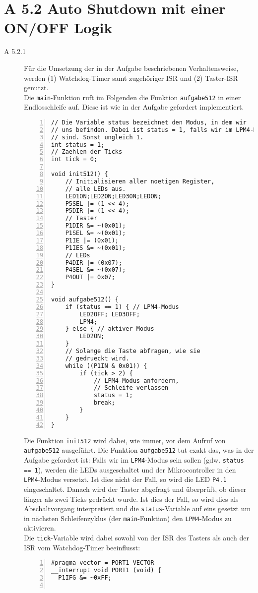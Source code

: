 \documentclass[11pt,a4paper,ngerman]{article}
\begin{document}
\section*{A 5.2 Auto Shutdown mit einer ON/OFF Logik}
\begin{description}
	\item[A 5.2.1] Für die Umsetzung der in der Aufgabe beschriebenen Verhaltensweise, werden (1) Watchdog-Timer samt zugehöriger ISR und (2) Taster-ISR genutzt. \\

	Die \texttt{main}-Funktion ruft im Folgenden die Funktion \texttt{aufgabe512} in einer Endlosschleife auf. Diese ist wie in der Aufgabe gefordert implementiert.
	
	\begin{lstlisting}[numbers=left]
// Die Variable status bezeichnet den Modus, in dem wir
// uns befinden. Dabei ist status = 1, falls wir im LPM4-Modus
// sind. Sonst ungleich 1.
int status = 1;
// Zaehlen der Ticks
int tick = 0;

void init512() {
	// Initialisieren aller noetigen Register,
	// alle LEDs aus.
	LED1ON;LED2ON;LED3ON;LEDON;
	P5SEL |= (1 << 4);
	P5DIR |= (1 << 4);
	// Taster
	P1DIR &= ~(0x01);
    P1SEL &= ~(0x01);
    P1IE |= (0x01);
    P1IES &= ~(0x01);
	// LEDs
    P4DIR |= (0x07);
    P4SEL &= ~(0x07);
    P4OUT |= 0x07;
}

void aufgabe512() {
	if (status == 1) { // LPM4-Modus
		LED2OFF; LED3OFF;
		LPM4;
	} else { // aktiver Modus
		LED2ON;
	}
	// Solange die Taste abfragen, wie sie
	// gedrueckt wird.
	while ((P1IN & 0x01)) {
		if (tick > 2) {
			// LPM4-Modus anfordern,
			// Schleife verlassen
			status = 1;
			break;
		}
	}
}
	\end{lstlisting}
	
	Die Funktion \texttt{init512} wird dabei, wie immer, vor dem Aufruf von \texttt{aufgabe512} ausgeführt. Die Funktion \texttt{aufgabe512} tut exakt das, was in der Aufgabe gefordert ist: Falls wir im \texttt{LPM4}-Modus sein sollen (gdw. \texttt{status == 1}), werden die LEDs ausgeschaltet und der Mikrocontroller in den \texttt{LPM4}-Modus versetzt. Ist dies nicht der Fall, so wird die LED \texttt{P4.1} eingeschaltet. Danach wird der Taster abgefragt und überprüft, ob dieser länger als zwei Ticks gedrückt wurde. Ist dies der Fall, so wird dies als Abschaltvorgang interpretiert und die \texttt{status}-Variable auf eins gesetzt um in nächsten Schleifenzyklus (der \texttt{main}-Funktion) den \texttt{LPM4}-Modus zu aktivieren. \\
	Die \texttt{tick}-Variable wird dabei sowohl von der ISR des Tasters als auch der ISR vom Watchdog-Timer beeinflusst:
	\begin{lstlisting}[numbers=left]
#pragma vector = PORT1_VECTOR
__interrupt void PORT1 (void) {
  P1IFG &= ~0xFF;


\end{lstlisting}
\end{description}
\end{document}
